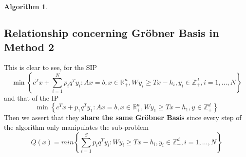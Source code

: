 \documentclass{article}
\theoremstyle{plain}
\theoremstyle{definition}
\newtheorem{algorithm}[theorem]{Algorithm}
\begin{document}
\begin{algorithm}
\subsection{Relationship concerning Gröbner Basis in Method 2}

This is clear to see, for the SIP 
\begin{equation}
\min \left\{c^{T} x+\sum_{i=1}^{N} p_{i} q^{T} y_{i}: A x= b, x \in \mathbb{R}_{+}^{n}, W_{} y_{i}\geq T x - h_{i}, y_{i} \in \mathbb{Z}_{+}^{d}, i=1, \ldots, N\right\}
\end{equation}
and that of the IP
\begin{equation}
\min \left\{c^{T} x+ p_{1} q^{T} y_{1}: A x= b, x \in \mathbb{R}_{+}^{n}, W y_{1}\geq T x- h_{1}, y_{} \in \mathbb{Z}_{+}^{d} \right\}
\end{equation}
Then we assert that they \textbf{share the same Gröbner Basis} since every step of the algorithm  only manipulates the sub-problem
\begin{equation}
Q(x)=min\left \{
\sum_{i=1}^{S} p_{i} q^{T} y_{i}: W y_{i}\geq T x - h_{i}, y_{i}  \in \mathbb{Z}_{+}^{d}, i=1, \ldots, N\right\}
\end{equation}


\end{algorithm}
\end{document}

